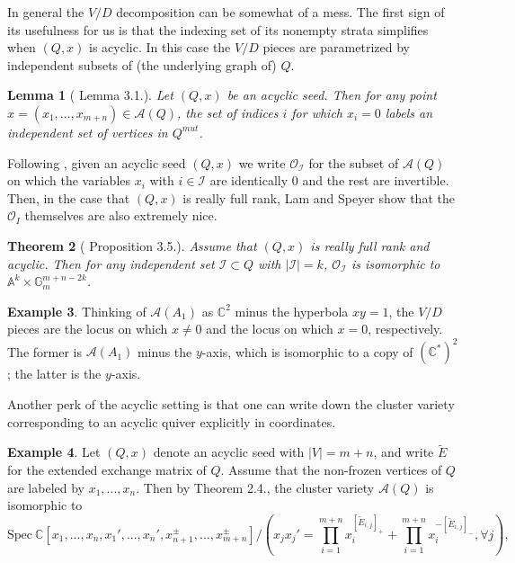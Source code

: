 \documentclass[11pt]{amsart}
\newtheorem{thm}{Theorem}[section]
\newtheorem{lem}[thm]{Lemma}
\theoremstyle{definition}
\newtheorem{exmp}[thm]{Example}
\theoremstyle{remark}
\numberwithin{equation}{section}
\begin{document}
In general the $V/D$ decomposition can be somewhat of a mess. The first sign of its usefulness for us is that the indexing set of its nonempty strata simplifies when $(Q, x)$ is acyclic. In this case the $V/D$ pieces are parametrized by independent subsets of (the underlying graph of) $Q$. 

\begin{lem}[\cite{LSII} Lemma 3.1.]\label{independent support}
    Let $(Q, x)$ be an acyclic seed. Then for any point $x = (x_1, ..., x_{m+n}) \in \mathcal{A}(Q)$, the set of indices $i$ for which $x_i = 0$ labels an independent set of vertices in $Q^{mut}$.
\end{lem}

Following \cite{LSII}, given an acyclic seed $(Q, x)$ we write $\mathcal{O}_\mathcal{I}$ for the subset of $\mathcal{A}(Q)$ on which the variables $x_i$ with $i \in \mathcal I$ are identically $0$ and the rest are invertible. Then, in the case that $(Q, x)$ is really full rank, Lam and Speyer show that the $\mathcal{O}_I$ themselves are also extremely nice.

\begin{thm}[\cite{LSII} Proposition 3.5.]\label{V/D pieces} Assume that $(Q, x)$ is really full rank and acyclic. Then for any independent set $\mathcal{I} \subset Q$ with $|\mathcal{I}| = k$, $\mathcal{O}_\mathcal{I}$ is isomorphic to $\mathbb{A}^k \times \mathbb{G}_m^{m + n - 2k}$.
\end{thm}

\begin{exmp}
    Thinking of $\mathcal{A}(A_1)$ as $\mathbb{C}^2$ minus the hyperbola $xy = 1$, the $V/D$ pieces are the locus on which $x \neq 0$ and the locus on which $x = 0$, respectively. The former is $\mathcal{A}(A_1)$ minus the $y$-axis, which is isomorphic to a copy of $(\mathbb{C}^*)^2$; the latter is the $y$-axis.
\end{exmp}

Another perk of the acyclic setting is that one can write down the cluster variety corresponding to an acyclic quiver explicitly in coordinates.

\begin{exmp}\label{complete int}
    Let $(Q, x)$ denote an acyclic seed with $|V| = m + n$, and write $\tilde{E}$ for the extended exchange matrix of $Q$. Assume that the non-frozen vertices of $Q$ are labeled by $x_1, ..., x_n$. Then by \cite{LSII} Theorem 2.4., the cluster variety $\mathcal{A}(Q)$ is isomorphic to $$\text{Spec}\:\mathbb{C}[x_1, ..., x_n, x_1', ..., x_n', x_{n+1}^\pm, ..., x_{m+n}^\pm]/(x_j x_j' = \prod_{i=1}^{m+n} x_i^{[\tilde{E}_{i,j}]_+} + \prod_{i=1}^{m+n} x_i^{-[\tilde{E}_{i,j}]_-} , \forall j),
    $$
\end{exmp}
\end{document}
